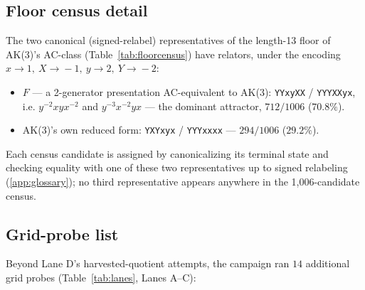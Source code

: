 \subsection{Floor census detail}

The two canonical (signed-relabel) representatives of the length-13 floor of AK(3)'s
AC-class (Table~\ref{tab:floorcensus}) have relators, under the encoding $x\!\to\!1,\
X\!\to\!-1,\ y\!\to\!2,\ Y\!\to\!-2$:

\begin{itemize}
  \item $F$ --- a 2-generator presentation AC-equivalent to AK(3): \texttt{YYxyXX} /
    \texttt{YYYXXyx}, i.e. $y^{-2}xyx^{-2}$ and $y^{-3}x^{-2}yx$ --- the dominant attractor,
    $712/1006$ ($70.8\%$).
  \item AK(3)'s own reduced form: \texttt{YXYxyx} / \texttt{YYYxxxx} --- $294/1006$
    ($29.2\%$).
\end{itemize}

Each census candidate is assigned by canonicalizing its terminal state and checking
equality with one of these two representatives up to signed relabeling (\ref{app:glossary});
no third representative appears anywhere in the 1,006-candidate census.

\subsection{Grid-probe list}

Beyond Lane D's harvested-quotient attempts, the campaign ran $14$ additional grid probes
(Table~\ref{tab:lanes}, Lanes A--C):

